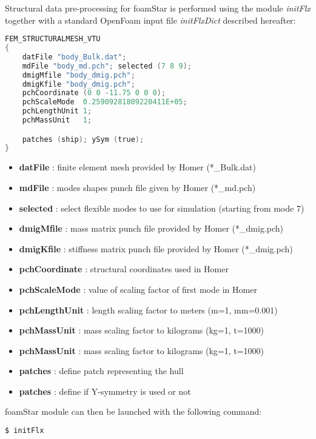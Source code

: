Structural data pre-processing for foamStar is performed using the module \emph{initFlx} together with a standard OpenFoam input file \emph{initFlxDict} described hereafter:

\begin{lstlisting}[language=C]
FEM_STRUCTURALMESH_VTU
{
    datFile "body_Bulk.dat";
    mdFile "body_md.pch"; selected (7 8 9);
    dmigMfile "body_dmig.pch";
    dmigKfile "body_dmig.pch";
    pchCoordinate (0 0 -11.75 0 0 0);
    pchScaleMode  0.25909281809220411E+05;
    pchLengthUnit 1;
    pchMassUnit   1;

    patches (ship); ySym (true);
}
\end{lstlisting}

\begin{itemize}
\item \textbf{datFile} : finite element mesh provided by Homer (*\_Bulk.dat)
\item \textbf{mdFile} : modes shapes punch file given by Homer (*\_md.pch)
\item \textbf{selected} : select flexible modes to use for simulation (starting from mode 7)
\item \textbf{dmigMfile} : mass matrix punch file provided by Homer (*\_dmig.pch)
\item \textbf{dmigKfile} : stiffness matrix punch file provided by Homer (*\_dmig.pch)
\item \textbf{pchCoordinate} : structural coordinates used in Homer
\item \textbf{pchScaleMode} : value of scaling factor of first mode in Homer
\item \textbf{pchLengthUnit} : length scaling factor to meters (m=1, mm=0.001)
\item \textbf{pchMassUnit} : mass scaling factor to kilograms (kg=1, t=1000)
\item \textbf{pchMassUnit} : mass scaling factor to kilograms (kg=1, t=1000)
\item \textbf{patches} : define patch representing the hull
\item \textbf{patches} : define if Y-symmetry is used or not
\end{itemize}

foamStar module can then be launched with the following command:
\begin{lstlisting}[language=bash]
$ initFlx
\end{lstlisting}




